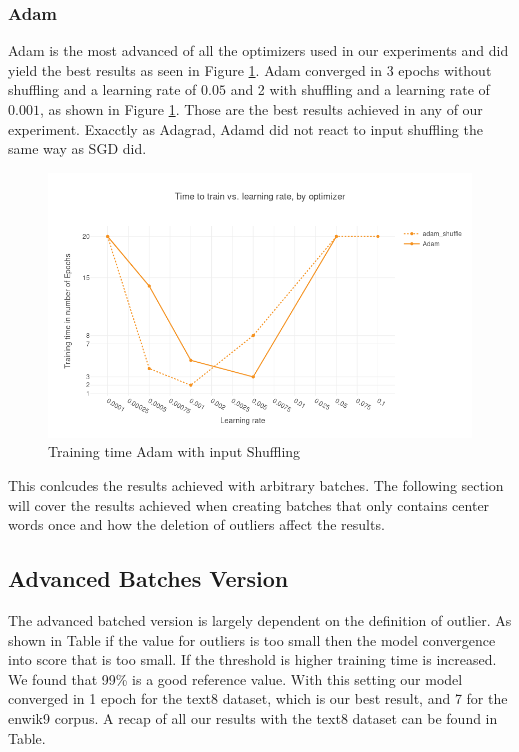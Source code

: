 \subsubsection{Adam}
Adam is the most advanced of all the optimizers used in our experiments and did yield the best results as seen in Figure \ref{fig:results_adam_shuffle}. Adam converged in 3 epochs without shuffling and a learning rate of $0.05$ and 2 with shuffling and a learning rate of $0.001$, as shown in Figure \ref{fig:results_adam_shuffle}. Those are the best results achieved in any of our experiment. Exacctly as Adagrad, Adamd did not react to input shuffling the same way as SGD did.
\begin{figure}[h]
    \centering
            \includegraphics[scale=0.3]{images/results_adam_shuffle} 
    \caption{Training time Adam with input Shuffling}
    \label{fig:results_adam_shuffle}
\end{figure}

This conlcudes the results achieved with arbitrary batches. The following section will cover the results achieved when creating batches that only contains center words once and how the deletion of outliers affect the results. 

\subsection{Advanced Batches Version}
The advanced batched version is largely dependent on the definition of outlier. As shown in Table if the value for outliers is too small then the model convergence into score that is too small. If the threshold is higher training time is increased. We found that 99\% is a good reference value. With this setting our model converged in 1 epoch for the text8 dataset, which is our best result, and 7 for the enwik9 corpus. A recap of all our results with the text8 dataset can be found in Table. 


